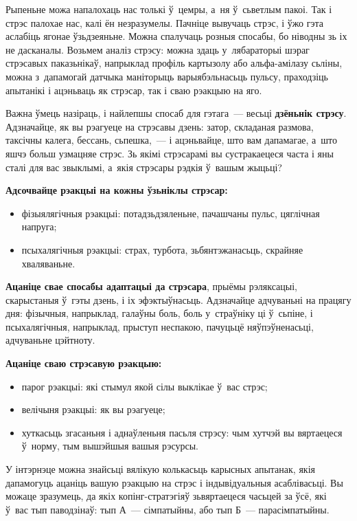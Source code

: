 Рыпеньне можа напалохаць нас толькі ў~цемры, а~ня ў~сьветлым пакоі. Так і стрэс палохае нас, калі ён незразумелы. Пачніце вывучаць стрэс, і ўжо гэта аслабіць ягонае ўзьдзеяньне. Можна спалучаць розныя спосабы, бо ніводны зь іх не дасканалы. Возьмем аналіз стрэсу: можна здаць у~лябараторыі шэраг стрэсавых паказьнікаў, напрыклад профіль картызолу або альфа-амілазу сьліны, можна з~дапамогай датчыка маніторыць варыябэльнасьць пульсу, праходзіць апытанікі і ацэньваць як стрэсар, так і сваю рэакцыю на яго.

Важна ўмець назіраць, і найлепшы спосаб для гэтага~--- весьці \textbf{дзёньнік стрэсу}. Адзначайце, як вы рэагуеце на стрэсавы дзень: затор, складаная размова, таксічны калега, бессань, сьпешка,~--- і ацэньвайце, што вам дапамагае, а~што яшчэ больш узмацняе стрэс. Зь якімі стрэсарамі вы сустракаецеся часта і яны сталі для вас звыклымі, а~якія стрэсары рэдкія ў~вашым жыцьці? 

\textbf{Адсочвайце рэакцыі на кожны ўзьніклы стрэсар:} 
\begin{itemize}
  \item фізыялягічныя рэакцыі: потадзьдзяленьне, пачашчаны пульс, цяглічная напруга;
  \item псыхалягічныя рэакцыі: страх, турбота, зьбянтэжанасьць, скрайняе хваляваньне. 
\end{itemize}

\textbf{Ацаніце свае спосабы адаптацыі да стрэсара}, прыёмы рэляксацыі, скарыстаныя ў~гэты дзень, і іх эфэктыўнасьць. Адзначайце адчуваньні на працягу дня: фізычныя, напрыклад, галаўны боль, боль у~страўніку ці ў~сьпіне, і псыхалягічныя, напрыклад, прыступ неспакою, пачуцьцё няўпэўненасьці, адчуваньне цэйтноту.

\textbf{Ацаніце сваю стрэсавую рэакцыю:}
\begin{itemize}
  \item парог рэакцыі: які стымул якой сілы выклікае ў~вас стрэс;
  \item велічыня рэакцыі: як вы рэагуеце;
  \item хуткасьць згасаньня і аднаўленьня пасьля стрэсу: чым хутчэй вы вяртаецеся ў~норму, тым вышэйшыя вашыя рэсурсы.
\end{itemize}

У інтэрнэце можна знайсьці вялікую колькасьць карысных апытанак, якія дапамогуць ацаніць вашую рэакцыю на стрэс і індывідуальныя асаблівасьці. Вы можаце зразумець, да якіх копінг-стратэгіяў зьвяртаецеся часьцей за ўсё, які ў~вас тып паводзінаў: тып А~--- сімпатыйны, або тып Б~--- парасімпатыйны.

